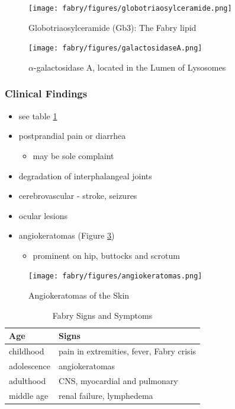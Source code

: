 \documentclass[12pt]{scrartcl}
\begin{document}
\begin{figure}[htbp]
\centering
\texttt{[image: fabry/figures/globotriaosylceramide.png]}
\caption[Globotriaosylceramide]{\label{fig:orgf0d485c}Globotriaosylceramide (Gb3): The Fabry lipid}
\end{figure}

\begin{figure}[htbp]
\centering
\texttt{[image: fabry/figures/galactosidaseA.png]}
\caption[\(\alpha\)-galactosidase A]{\label{fig:org8633de2}\(\alpha\)-galactosidase A, located in the Lumen of Lysosomes}
\end{figure}


\subsubsection{Clinical Findings}
\label{sec:org4f7892e}
\begin{itemize}
\item see table \ref{tab:orga293f2c}
\item postprandial pain or diarrhea
\begin{itemize}
\item may be sole complaint
\end{itemize}
\item degradation of interphalangeal joints
\item cerebrovascular - stroke, seizures
\item ocular lesions
\item angiokeratomas (Figure \ref{fig:orgc92a635})
\begin{itemize}
\item prominent on hip, buttocks and scrotum
\end{itemize}
\end{itemize}

\begin{figure}[htbp]
\centering
\texttt{[image: fabry/figures/angiokeratomas.png]}
\caption[Angiokeratomas of the skin]{\label{fig:orgc92a635}Angiokeratomas of the Skin}
\end{figure}

\begin{table}[htbp]
\caption{\label{tab:orga293f2c}Fabry Signs and Symptoms}
\centering
\begin{tabular}{ll}
Age & Signs\\
\hline
childhood & pain in extremities, fever, Fabry crisis \footnotemark\\
adolescence & angiokeratomas\\
adulthood & CNS, myocardial and pulmonary\\
middle age & renal failure, lymphedema\\
\end{tabular}
\end{table}
\end{document}
